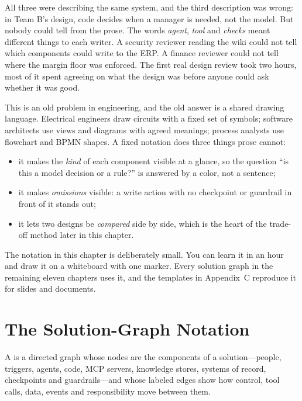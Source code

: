 All three were describing the same system, and the third description was wrong: in Team B's design, code decides when a manager is needed, not the model. But nobody could tell from the prose. The words \emph{agent}, \emph{tool} and \emph{checks} meant different things to each writer. A security reviewer reading the wiki could not tell which components could write to the ERP. A finance reviewer could not tell where the margin floor was enforced. The first real design review took two hours, most of it spent agreeing on what the design was before anyone could ask whether it was good.

This is an old problem in engineering, and the old answer is a shared drawing language. Electrical engineers draw circuits with a fixed set of symbols; software architects use views and diagrams with agreed meanings; process analysts use flowchart and BPMN shapes. A fixed notation does three things prose cannot:
\begin{itemize}[itemsep=1pt]
  \item it makes the \emph{kind} of each component visible at a glance, so the question ``is this a model decision or a rule?'' is answered by a color, not a sentence;
  \item it makes \emph{omissions} visible: a write action with no checkpoint or guardrail in front of it stands out;
  \item it lets two designs be \emph{compared} side by side, which is the heart of the trade-off method later in this chapter.
\end{itemize}

The notation in this chapter is deliberately small. You can learn it in an hour and draw it on a whiteboard with one marker. Every solution graph in the remaining eleven chapters uses it, and the templates in Appendix~C reproduce it for slides and documents.

\section{The Solution-Graph Notation}
\label{sec:notation}

\begin{definition}
A  is a directed graph whose nodes are the components of a solution---people, triggers, agents, code, MCP servers, knowledge stores, systems of record, checkpoints and guardrails---and whose labeled edges show how control, tool calls, data, events and responsibility move between them.
\end{definition}

